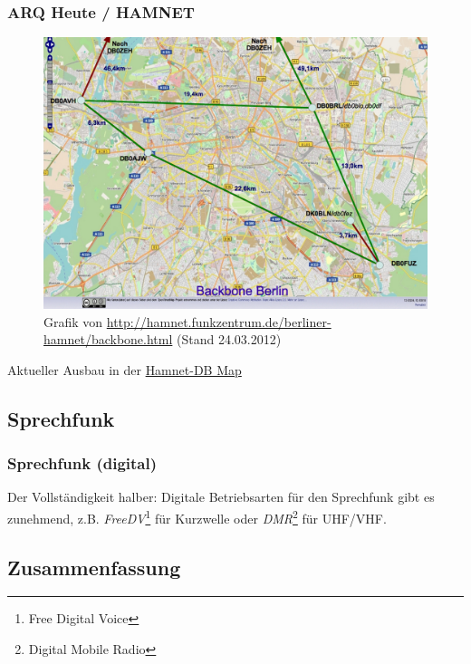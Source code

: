 \begin{frame}
  \frametitle{ARQ Heute / HAMNET}

  \begin{center}
    \begin{figure}
      \includegraphics[width=.8\textwidth,height=.65\textheight,keepaspectratio]{e16/backbone_berlin1201.jpg}
      \caption{Grafik von \ExternalLink\url{http://hamnet.funkzentrum.de/berliner-hamnet/backbone.html} (Stand 24.03.2012)}
    \end{figure}
  \end{center}

  Aktueller Ausbau in der \href{https://hamnetdb.net/lsp_map.cgi}{\ExternalLink Hamnet-DB Map}

\end{frame}

\subsection{Sprechfunk}

\begin{frame}
  \frametitle{Sprechfunk (digital)}


  Der Vollständigkeit halber: Digitale Betriebsarten für den Sprechfunk gibt
  es zunehmend, z.B. \emph{FreeDV}\footnote{Free Digital Voice} für Kurzwelle oder \emph{DMR}\footnote{Digital Mobile Radio} für UHF/VHF.

\end{frame}

\subsection[]{Zusammenfassung}

